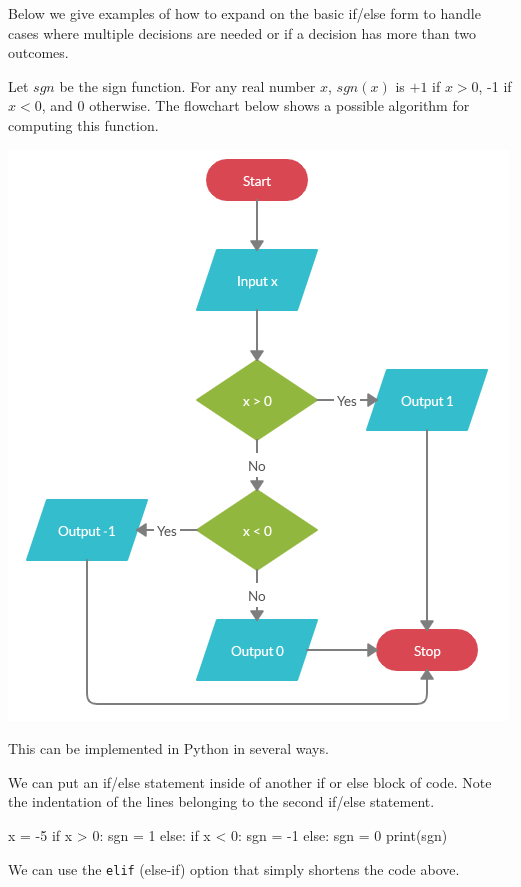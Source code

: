 \documentclass{ximera}
\begin{document}
Below we give examples of how to expand on the basic if/else form to handle cases where multiple decisions are needed or if a decision has more than two outcomes. 

Let $sgn$ be the sign function. For any real number $x$, $sgn(x)$ is $+1$ if $x>0$, -1 if $x<0$, and $0$ otherwise. The flowchart below shows a possible algorithm for computing this function.

\begin{center}
	\includegraphics{signfun.png}
\end{center}

This can be implemented in Python in several ways. 

We can put an if/else statement inside of another if or else block of code. Note the indentation of the lines belonging to the second if/else statement.

\begin{sageCell}
x = -5
if x > 0:
	sgn = 1
else:
	if x < 0:
		sgn = -1
	else:
		sgn = 0
print(sgn)
\end{sageCell}
	
We can use the \verb|elif| (else-if) option that simply shortens the code above.
\end{document}
